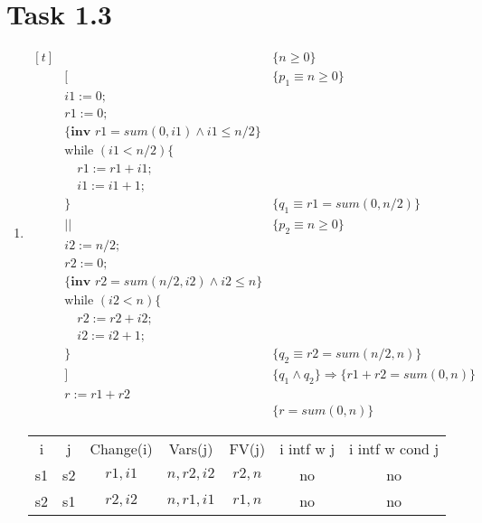 \documentclass{article}
\newcommand{\answer}{\item[]} %
\begin{document}
	\section{Task 1.3}
	
		\begin{enumerate}[label={(\alph*)}]
			
			\answer
			$\begin{aligned}[t]
				&\qquad \qquad \qquad \qquad &\{n \geq 0\} \\
				&[ &\{p_{1} \equiv n \geq 0\} \\
				&i1 := 0; \\
				&r1 := 0; \\
				&\{\textbf{inv } r1 = sum(0, i1) \land i1 \leq n / 2\} \\
				&\text{while }(i1 < n / 2) \{ \\
				&\quad r1 := r1 + i1; \\
				&\quad i1 := i1 + 1; \\ 
				&\} &\{q_{1} \equiv r1 = sum(0, n / 2)\} \\
				&|| &\{p_{2} \equiv n \geq 0\} \\ 
				&i2 := n / 2; \\
				&r2 := 0; \\
				&\{\textbf{inv } r2 = sum(n / 2, i2) \land i2 \leq n\} \\
				&\text{while } (i2 < n) \{ \\
				&\quad r2 := r2 + i2; \\
				&\quad i2 := i2 + 1; \\
				&\} &\{q_{2} \equiv r2 = sum(n / 2, n)\} \\
				&] &\{q_{1} \land q_{2}\} \Rightarrow \{r1 + r2 = sum(0, n)\} \\
				&r := r1 + r2 \\
				& &\{r = sum(0, n)\}
			\end{aligned}$
		
			\begin{tabular}{c c c c c c c}
				i & j & Change(i) & Vars(j) & FV(j) & i intf w j & i intf w cond j \\
				s1 & s2 & $r1, i1$ & $n, r2, i2$ & $r2, n$ & no & no \\
				s2 & s1 & $r2, i2$ & $n, r1, i1$ & $r1, n$ & no & no \\ 
			\end{tabular}
			
		\end{enumerate}
	
	\pagebreak
	
\end{document}
